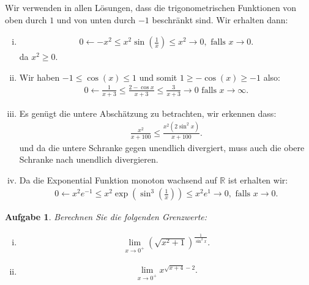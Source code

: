 \documentclass[a4paper, 20]{exam}
\newtheorem{ex}{Aufgabe}
\begin{document}
\begin{solution} Wir verwenden in allen Lösungen, dass die trigonometrischen Funktionen von oben durch $1$ und von unten durch $-1$ beschränkt sind. Wir erhalten dann:
\begin{enumerate}[i)]
\item \begin{align*}
0 \longleftarrow -x^2 \leq x^2 \sin \left( \frac{1}{x} \right) \leq x^2 \longrightarrow 0, \text{ falls } x \longrightarrow 0. 
\end{align*}
da $x^2 \geq 0$.
\item Wir haben $-1 \leq \cos (x) \leq 1$ und somit $ 1 \geq - \cos(x) \geq -1 $ also:
\begin{align*}
0 \longleftarrow \frac{1}{x+3} \leq \frac{2- \cos x}{x+3} \leq \frac{3}{x + 3} \longrightarrow 0  \text{ falls } x \longrightarrow \infty.
\end{align*}
\item Es genügt die untere Abschätzung zu betrachten, wir erkennen dass: 
\begin{align*}
\frac{x^2}{x+100} \leq \frac{x^2 (2 \sin^2 x)}{x+100}.
\end{align*}
und da die untere Schranke gegen unendlich divergiert, muss auch die obere Schranke nach unendlich divergieren. 
\item Da die Exponential Funktion monoton wachsend auf $\mathbb{R}$ ist erhalten wir: 
\begin{align*}
0 \longleftarrow x^2 e^{-1} \leq x^2 \exp \left(  \sin^3 \left( \frac{1}{x} \right) \right) \leq x^2 e^1 \longrightarrow 0, \text{ falls } x \longrightarrow 0.
\end{align*}
\end{enumerate}
\end{solution}


\begin{ex} Berechnen Sie die folgenden Grenzwerte:
\begin{enumerate}[i)]
\item \begin{align*}
 \lim_{x \rightarrow 0^+} \left( \sqrt{x^2 +1} \right)^{ \frac{1}{\sin^2 x}} .
\end{align*}
\item \begin{align*}
\lim_{x \rightarrow 0^+} x^{ \sqrt{x+4}-2}.
\end{align*}
\end{enumerate}

\end{ex}
\end{document}
